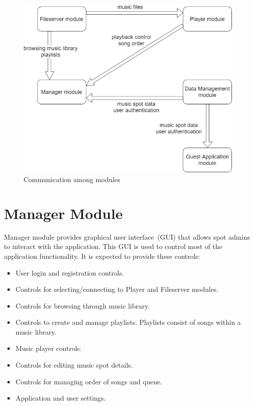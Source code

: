 \begin{figure}[ht]\centering
\includegraphics[width=1.0\textwidth]{img/CommunicationGraph2}
\caption{Communication among modules}
\label{fig02:communicationAmongModules}
\end{figure}

\section {Manager Module}

Manager module provides graphical user interface~(GUI) that allows spot admins to interact with the application. This GUI is used to control most of the application functionality. It is expected to provide these controls:
\begin{itemize}
    \item User login and registration controls.
    \item Controls for selecting/connecting to Player and Fileserver modules.
    \item Controls for browsing through music library.
    \item Controls to create and manage playlists. Playlists consist of songs within a music library.
    \item Music player controls.
    \item Controls for editing music spot details.
    \item Controls for managing order of songs and queue.
    \item Application and user settings.
\end{itemize}

